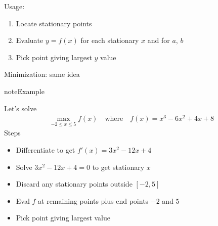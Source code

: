 \documentclass[letterpaper,10pt,english]{jupyterBook}
\begin{document}
\sphinxAtStartPar
Usage:
\begin{enumerate}
%
\item {} 
\sphinxAtStartPar
Locate stationary points

\item {} 
\sphinxAtStartPar
Evaluate \(y = f(x)\) for each stationary \(x\) and for \(a\), \(b\)

\item {} 
\sphinxAtStartPar
Pick point giving largest \(y\) value

\end{enumerate}

\sphinxAtStartPar
Minimization: same idea

\begin{sphinxadmonition}{note}{Example}

\sphinxAtStartPar
Let’s solve
\begin{equation*}
\begin{split} 
\max_{-2 \leq x \leq 5} f(x) 
\quad \text{where} \quad
f(x) = x^3 - 6x^2 + 4x + 8
\end{split}
\end{equation*}
\sphinxAtStartPar
Steps
\begin{itemize}
\item {} 
\sphinxAtStartPar
Differentiate to get \(f'(x) = 3x^2 - 12x + 4\)

\item {} 
\sphinxAtStartPar
Solve \(3x^2 - 12x + 4 = 0\) to get stationary \(x\)

\item {} 
\sphinxAtStartPar
Discard any stationary points outside \([-2, 5]\)

\item {} 
\sphinxAtStartPar
Eval \(f\) at remaining points plus end points \(-2\) and \(5\)

\item {} 
\sphinxAtStartPar
Pick point giving largest value

\end{itemize}
\end{sphinxadmonition}
\end{document}
